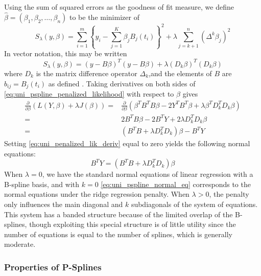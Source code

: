 \documentclass[12pt]{article}
\newcommand*\outlineskeleton{\color{green}}
\begin{document}
Using the sum of squared errors as the goodness of fit measure, we define $\hat{\beta} = \left(\beta_1, \beta_2, \dots, \beta_n \right)$ to be the minimizer of
\begin{equation*}  
S_\lambda\left(y, \beta \right) = \sum_{i=1}^m \left\{ y_i - \sum_{j=1}^K \beta_j B_j\left(t_i\right) \right\}^2 + \lambda \sum_{j=k+1}^n \left( \Delta^k\beta_j \right)^2
\end{equation*}
\noindent
In vector notation, this may be written
\begin{equation}\label{eq:uni_pspline_penalized_likelihood}
S_\lambda \left(y, \beta \right) = \left( y- B\beta  \right)^T \left( y-B \beta\right) + \lambda \left(D_k \beta\right)^T\left(D_k \beta\right)
\end{equation}
\noindent
where $D_k$ is the matrix difference operator $\Delta_k$,and the elements of $B$ are $b_{ij} = B_j\left(t_i\right)$ as defined . Taking derivatives on both sides of \ref{eq:uni_pspline_penalized_likelihood} with respect to $\beta$ gives
\begin{align}
\frac{\partial}{\partial \beta}\left(L\left(Y, \beta \right) + \lambda J\left(\beta\right) \right) ={} & \frac{\partial}{\partial \beta}\left(\beta^TB^TB \beta -2Y^T B^T\beta+\lambda \beta^T D_k^T D_k \beta  \right) \nonumber \\
= {} & 2B^TB \beta - 2B^T Y + 2\lambda D_k^TD_k\beta \nonumber\\
= {} & \left(B^T B +  \lambda D_k^TD_k\right)\beta - B^T Y \label{eq:uni_penalized_lik_deriv}
\end{align} 
\noindent
Setting \ref{eq:uni_penalized_lik_deriv} equal to zero yields the following normal equations:
\begin{equation}\label{eq:uni_pspline_normal_eq}
B^T Y = \left(B^T B +  \lambda D_k^TD_k\right)\beta
\end{equation}
When $\lambda = 0$, we have the standard normal equations of linear regression with a B-spline basis, and with $k = 0$ \ref{eq:uni_pspline_normal_eq} corresponds to the normal equations under the ridge regression penalty. When $\lambda > 0$, the penalty only influences the main diagonal and $k$ subdiagonals of the system of equations. This system has a banded structure because of the limited overlap of the B-splines, though exploiting this special structure is of little utility since the number of equations is equal to the number of splines, which is generally moderate. 


\subsubsection{{\outlineskeleton Properties of P-Splines}}
\end{document}
